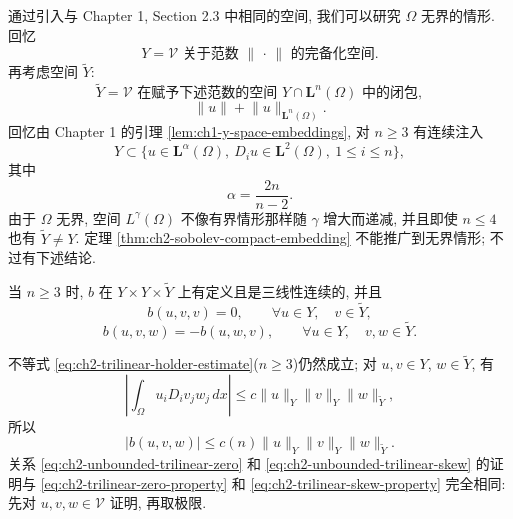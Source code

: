 通过引入与 Chapter 1, Section 2.3 中相同的空间, 我们可以研究 $\Omega$ 无界的情形. 回忆
\begin{equation}
Y=\mathcal V\text{ 关于范数 }\lVert\,\cdot\,\rVert\text{ 的完备化空间}.
\label{eq:ch2-y-definition}
\end{equation}
再考虑空间 $\widetilde Y$:
\begin{equation}
\widetilde Y=\mathcal V\text{ 在赋予下述范数的空间 }Y\cap\mathbf L^n(\Omega)\text{ 中的闭包},
\label{eq:ch2-y-tilde-definition}
\end{equation}
\begin{equation}
\lVert u\rVert+\lVert u\rVert_{\mathbf L^n(\Omega)}.
\label{eq:ch2-y-tilde-norm}
\end{equation}
回忆由 Chapter 1 的引理 \ref{lem:ch1-y-space-embeddings}, 对 $n\geq3$ 有连续注入
\begin{equation}
Y\subset\{u\in\mathbf L^\alpha(\Omega),\ D_i u\in\mathbf L^2(\Omega),\ 1\leq i\leq n\},
\label{eq:ch2-y-continuous-injection}
\end{equation}
其中
\begin{equation}
\alpha=\frac{2n}{n-2}.
\label{eq:ch2-y-sobolev-exponent}
\end{equation}
由于 $\Omega$ 无界, 空间 $L^\gamma(\Omega)$ 不像有界情形那样随 $\gamma$ 增大而递减, 并且即使 $n\leq4$ 也有 $\widetilde Y\neq Y$. 定理 \ref{thm:ch2-sobolev-compact-embedding} 不能推广到无界情形; 不过有下述结论.

\begin{Lemma}
\label{lem:ch2-unbounded-trilinear-continuity}
当 $n\geq3$ 时, $b$ 在 $Y\times Y\times\widetilde Y$ 上有定义且是三线性连续的, 并且
\begin{equation}
b(u,v,v)=0,
\qquad\forall u\in Y,\quad v\in\widetilde Y,
\label{eq:ch2-unbounded-trilinear-zero}
\end{equation}
\begin{equation}
b(u,v,w)=-b(u,w,v),
\qquad\forall u\in Y,\quad v,w\in\widetilde Y.
\label{eq:ch2-unbounded-trilinear-skew}
\end{equation}
\end{Lemma}

\begin{Proof}
不等式 \eqref{eq:ch2-trilinear-holder-estimate}($n\geq3$)仍然成立; 对 $u,v\in Y$, $w\in\widetilde Y$, 有
\[
\left|\int_\Omega u_iD_i v_jw_j\,dx\right|
\leq c\lVert u\rVert_Y\lVert v\rVert_Y\lVert w\rVert_{\widetilde Y},
\]
所以
\begin{equation}
|b(u,v,w)|\leq c(n)\lVert u\rVert_Y\lVert v\rVert_Y\lVert w\rVert_{\widetilde Y}.
\label{eq:ch2-unbounded-trilinear-bound}
\end{equation}
关系 \eqref{eq:ch2-unbounded-trilinear-zero} 和 \eqref{eq:ch2-unbounded-trilinear-skew} 的证明与 \eqref{eq:ch2-trilinear-zero-property} 和 \eqref{eq:ch2-trilinear-skew-property} 完全相同: 先对 $u,v,w\in\mathcal V$ 证明, 再取极限.
\end{Proof}

